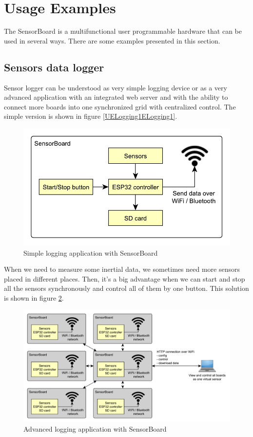 \section{Usage Examples}
The SensorBoard is a multifunctional user programmable hardware that can be used in several ways. There are some examples presented in this section.

\subsection{Sensors data logger}
\label{ExampleLogger}
Sensor logger can be understood as very simple logging device or as a very advanced application with an integrated web server and with the ability to connect more boards into one synchronized grid with centralized control. The simple version is shown in figure \ref{UELogging1ELogging1}.

\begin{figure}[H]
	\centering
	\label{UELogging1}
	\caption{Simple logging application with SensorBoard}
	\includegraphics[scale=1]{img/UsageExamplesLogger1.pdf}
\end{figure}

When we need to measure some inertial data, we sometimes need more sensors placed in different places. Then, it's a big advantage when we can start and stop all the sensors synchronously and control all of them by one button. This solution is shown in figure \ref{UELogging2}.

\begin{figure}[H]
	\centering
	\label{UELogging2}
	\caption{Advanced logging application with SensorBoard}
	\includegraphics[width=16cm]{img/UsageExamplesLogger2.pdf}
\end{figure}

